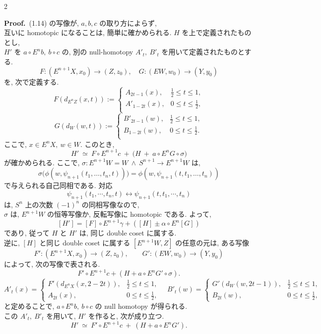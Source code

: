 \documentclass[10pt, leqno]{ltjsarticle}
\newcommand{\Ex}{E}        %
\numberwithin{equation}{section}
\theoremstyle{plain}
\theoremstyle{definition}
\theoremstyle{remark}
\begin{document}
\begin{paracol}{2}

\noindent
\textbf{Proof.}\
(1.14) の写像が,
\(a,b,c\) の取り方によらず, \\
互いに homotopic になることは, 簡単に確かめられる.
$H$ を上で定義されたものとし, \\
\(H'\) を
\(a\circ E^n b,\ b\circ c\) の, 
別の null-homotopy $A'_t,\ B'_t$ を用いて定義されたものとする.
\[
F:(\Ex^{n+1}X,x_0)\to (Z,z_0), \quad
G:(\Ex W,w_0)\to (Y,y_0)
\]
を, 次で定義する.
\[
F(d_{E^{n}Z}(x,t)) := \left\{
\begin{array}{ll}
A_{2t-1}(x), & \frac{1}{2} \leq t \leq 1, \\
A'_{1-2t}(x), & 0 \leq t \leq \frac{1}{2}, \\
\end{array}\right.
\]
\[
G(d_{W}(w,t)) := \left\{
\begin{array}{ll}
B'_{2t-1}(w), & \frac{1}{2} \leq t \leq 1, \\
B_{1-2t}(w), & 0 \leq t \leq \frac{1}{2}. \\
\end{array}\right.
\]
ここで,
\(x\in E^n X,\ w\in W\).
このとき,
\[
H'\ \simeq\ F\circ \Ex^{n+1}c\ +\ \bigl(H\ +\ a\circ \Ex^n G\circ \sigma\bigr)
\]
が確かめられる. 
ここで, 
$\sigma:\Ex^{n+1}W=W\ \wedge\ S^{n+1}\to \Ex^{n+1}W$ は,
\[
\sigma\bigl(\phi(w,\psi_{n+1}(t_1,\ldots,t_n,t))\bigr)=\phi(w, \psi_{n+1}(t, t_1,\ldots,t_n))
\]
で与えられる自己同相である. 対応
\[
\psi_{n+1}(t_1,\cdots,t_n, t) \longleftrightarrow
\psi_{n+1}(t,t_1,\cdots,t_n)
\]
は, $S^{n}$ 上の次数 $(-1)^n$ の同相写像なので,\\
\(\sigma\) は,
\(E^{n+1}W\) の恒等写像か,
反転写像に homotopic である.
よって,
\[
[H'] = [F]\circ E^{n+1}\gamma + 
([H] \pm \alpha \circ E^n [G])
\]
であり,
従って $H$ と $H'$ は, 
同じ double coset に属する. \\
逆に, \([H]\) と同じ double coset に属する \([E^{n+1}W,Z]\) の任意の元は,
ある写像
\[
F':(E^{n+1}X,x_0)\to(Z,z_0),\qquad
G':(EW, w_0)\to (Y,y_0)
\]
によって, 次の写像で表される.
\[
F'\circ E^{n+1}c + (H + a\circ E^n G'\circ \sigma).
\]
\[
A'_t(x)=
\begin{cases}
F'(d_{E^n X}(x,2-2t)),& \tfrac12\le t\le 1,\\
A_{2t}(x),& 0\le t\le \tfrac12,
\end{cases}
\quad
B'_t(w)=
\begin{cases}
G'(d_W(w,2t-1)),& \tfrac12\le t\le 1,\\
B_{2t}(w),& 0\le t\le \tfrac12,
\end{cases}
\]
と定めることで,
\(a\circ E^n b,\ b\circ c\) の null homotopy が得られる.\\
この \(A'_t,\ B'_t\) を用いて, $H'$ を作ると,
次が成り立つ.
\[
H'\ \simeq\ F'\circ \Ex^{n+1}c\ +\ (H+a\circ \Ex^n G').
\]


\end{paracol}
\end{document}
